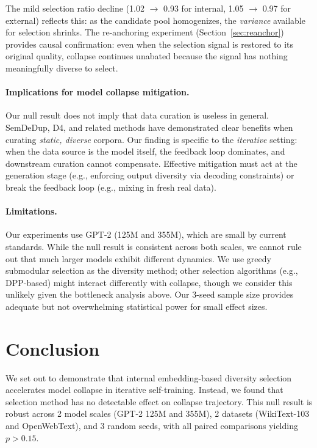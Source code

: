 \documentclass[11pt]{article}
\begin{document}
The mild selection ratio decline (1.02 $\to$ 0.93 for internal, 1.05 $\to$ 0.97 for external) reflects this: as the candidate pool homogenizes, the \emph{variance} available for selection shrinks. The re-anchoring experiment (Section~\ref{sec:reanchor}) provides causal confirmation: even when the selection signal is restored to its original quality, collapse continues unabated because the signal has nothing meaningfully diverse to select.

\paragraph{Implications for model collapse mitigation.}
Our null result does not imply that data curation is useless in general. SemDeDup, D4, and related methods have demonstrated clear benefits when curating \emph{static, diverse} corpora. Our finding is specific to the \emph{iterative} setting: when the data source is the model itself, the feedback loop dominates, and downstream curation cannot compensate. Effective mitigation must act at the generation stage (e.g., enforcing output diversity via decoding constraints) or break the feedback loop (e.g., mixing in fresh real data).

\paragraph{Limitations.}
Our experiments use GPT-2 (125M and 355M), which are small by current standards. While the null result is consistent across both scales, we cannot rule out that much larger models exhibit different dynamics. We use greedy submodular selection as the diversity method; other selection algorithms (e.g., DPP-based) might interact differently with collapse, though we consider this unlikely given the bottleneck analysis above. Our 3-seed sample size provides adequate but not overwhelming statistical power for small effect sizes.

\section{Conclusion}

We set out to demonstrate that internal embedding-based diversity selection accelerates model collapse in iterative self-training. Instead, we found that selection method has no detectable effect on collapse trajectory. This null result is robust across 2 model scales (GPT-2 125M and 355M), 2 datasets (WikiText-103 and OpenWebText), and 3 random seeds, with all paired comparisons yielding $p > 0.15$.
\end{document}

